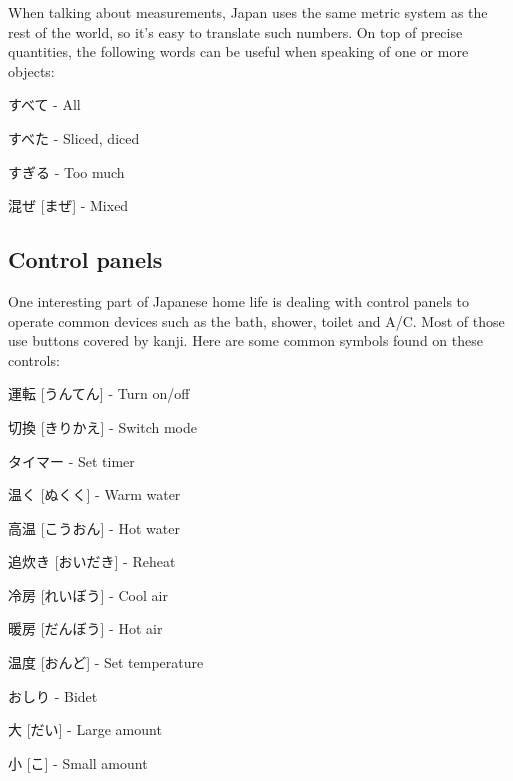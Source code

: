 \documentclass{article}
\begin{document}
\begin{CJK}{UTF8}{min}
\begin{multicols*}{3}
When talking about measurements, Japan uses the same metric system as the rest of the world, so it's easy to translate such numbers. On top of precise quantities, the following words 
can be useful when speaking of one or more objects:

\begin{colorize}
\item すべて - All
\item すべた - Sliced, diced
\item すぎる - Too much
\item 混ぜ [まぜ] - Mixed
\end{colorize}

\subsection{Control panels}

One interesting part of Japanese home life is dealing with control panels to operate common devices such as the bath, shower, toilet and A/C. Most of those use buttons covered by 
kanji. Here are some common symbols found on these controls:

\begin{colorize}
\item 運転 [うんてん] - Turn on/off
\item 切換 [きりかえ] - Switch mode
\item タイマー - Set timer
\item 温く [ぬくく] - Warm water
\item 高温 [こうおん] - Hot water
\item 追炊き [おいだき] - Reheat
\item 冷房 [れいぼう] - Cool air
\item 暖房 [だんぼう] - Hot air
\item 温度 [おんど] - Set temperature
\item おしり - Bidet
\item 大 [だい] - Large amount
\item 小 [こ] - Small amount
\end{colorize}






\end{multicols*}
\end{CJK}
\end{document}
